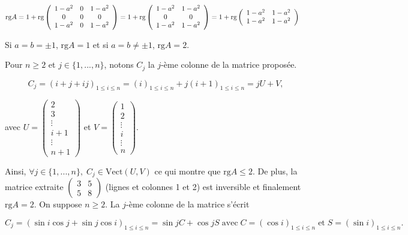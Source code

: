 {{\begin{itemize}
\begin{align*}\ensuremath
\mbox{rg}A&=1+\mbox{rg}\left(
\begin{array}{ccc}
1-a^2&0&1-a^2\\
0&0&0\\
1-a^2&0&1-a^2
\end{array}
\right)=1+\mbox{rg}\left(
\begin{array}{cc}
1-a^2&1-a^2\\
0&0\\
1-a^2&1-a^2
\end{array}
\right)=1+\mbox{rg}\left(
\begin{array}{cc}
1-a^2&1-a^2\\
1-a^2&1-a^2
\end{array}
\right)
\end{align*}

Si $a=b=\pm1$, $\mbox{rg}A=1$ et si $a=b\neq\pm1$, $\mbox{rg}A=2$.
\end{itemize}
Pour $n\geq2$ et $j\in\{1,...,n\}$, notons $C_j$ la $j$-ème colonne de la matrice proposée.

$$C_j=(i+j+ij)_{1\leq i\leq n}=(i)_{1\leq i\leq n}+j(i+1)_{1\leq i\leq n}=jU+V,$$

avec $U=\left(\begin{array}{c}
2\\
3\\
\vdots\\
i+1\\
\vdots\\
n+1
\end{array}
\right)$ 
et $V=\left(\begin{array}{c}
1\\
2\\
\vdots\\
i\\
\vdots\\
n
\end{array}
\right)$.

Ainsi, $\forall j\in\{1,...,n\},\;C_j\in\mbox{Vect}(U,V)$ ce qui montre que $\mbox{rg}A\leq2$.
De plus, la matrice extraite $\left(
\begin{array}{cc}
3&5\\
5&8
\end{array}
\right)$ (lignes et colonnes 1 et 2) est inversible et finalement $\mbox{rg}A=2$.
On suppose $n\geq2$. La $j$-ème colonne de la matrice s'écrit

$$C_j=(\sin i\cos j+\sin j\cos i)_{1\leq i\leq n}=\sin jC+\cos jS\;\mbox{avec}\;C=(\cos i)_{1\leq i\leq n}\;\mbox{et}\;S=(\sin i)_{1\leq i\leq n}.$$

}}
